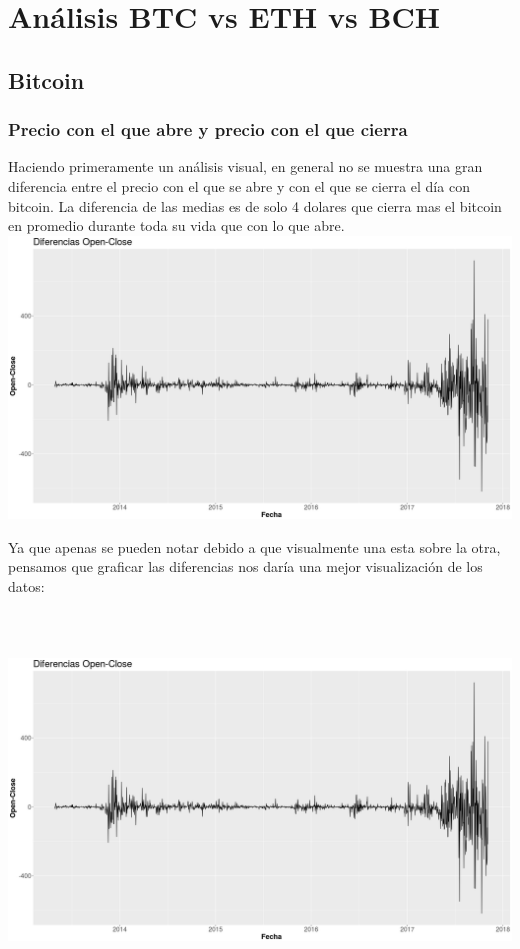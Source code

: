 \documentclass[12pt,letterpaper]{article}
\begin{document}
\section*{An\'alisis BTC vs ETH vs BCH}

    \subsection*{Bitcoin}

    \subsubsection*{Precio con el que abre y precio con el que cierra}

    Haciendo primeramente un an\'alisis visual, en general no se muestra una gran diferencia entre el precio con el que se abre y con el que se cierra el día con bitcoin. La diferencia de las medias es de solo 4 dolares que cierra mas el bitcoin en promedio durante toda su vida que con lo que abre.
    \\
    
    \includegraphics{btc/diferencias_BTC_OpenClose}

    Ya que apenas se pueden notar debido a que visualmente una esta sobre la otra, pensamos que graficar las diferencias nos dar\'ia una mejor visualizaci\'on de los datos:

    \includegraphics[width = 18cm, height = 10cm]{btc/diferencias_BTC_OpenClose}
\end{document}
